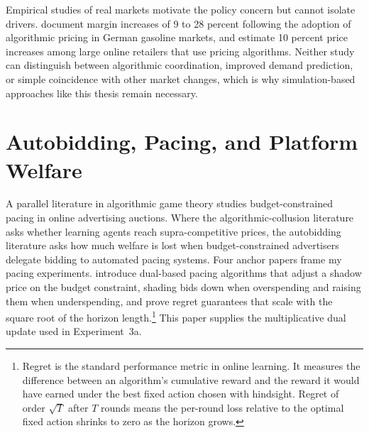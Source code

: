 Empirical studies of real markets motivate the policy concern but cannot isolate drivers. \citet{Assad2020} document margin increases of 9 to 28 percent following the adoption of algorithmic pricing in German gasoline markets, and \citet{BrownMacKay2023} estimate 10 percent price increases among large online retailers that use pricing algorithms. Neither study can distinguish between algorithmic coordination, improved demand prediction, or simple coincidence with other market changes, which is why simulation-based approaches like this thesis remain necessary.

\section{Autobidding, Pacing, and Platform Welfare}
\label{sec:lit_autobidding}

A parallel literature in algorithmic game theory studies budget-constrained pacing in online advertising auctions. Where the algorithmic-collusion literature asks whether learning agents reach supra-competitive prices, the autobidding literature asks how much welfare is lost when budget-constrained advertisers delegate bidding to automated pacing systems. Four anchor papers frame my pacing experiments. \citet{Balseiro2019Learning} introduce dual-based pacing algorithms that adjust a shadow price on the budget constraint, shading bids down when overspending and raising them when underspending, and prove regret guarantees that scale with the square root of the horizon length.\footnote{Regret is the standard performance metric in online learning. It measures the difference between an algorithm's cumulative reward and the reward it would have earned under the best fixed action chosen with hindsight. Regret of order $\sqrt{T}$ after $T$ rounds means the per-round loss relative to the optimal fixed action shrinks to zero as the horizon grows.} This paper supplies the multiplicative dual update used in Experiment~3a.

